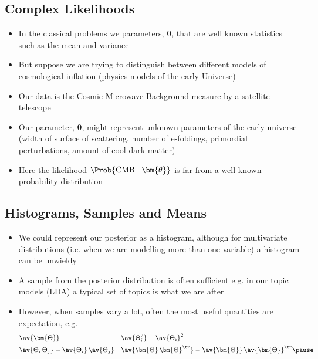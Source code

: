 \begin{slide}
\section[-2]{Complex Likelihoods}

\begin{PauseHighLight}\squeeze
  \begin{itemize}
  \item In the classical problems we  parameters,
    $\bm{\theta}$, that are well known statistics such as the mean and
    variance\pause
  \item But suppose we are trying to distinguish between different
    models of cosmological inflation (physics models of the early
    Universe)\pause
  \item Our data is the Cosmic Microwave Background measure by a
    satellite telescope\pause
  \item Our parameter, $\bm{\theta}$, might represent unknown
    parameters of the early universe (width of surface of scattering,
    number of e-foldings, primordial perturbations, amount of
    cool dark matter)\pause
  \item Here the likelihood $\Prob{\text{CMB} \mid \bm{\theta}}$ is
    far from a well known probability distribution\pause
  \end{itemize}
\end{PauseHighLight}


\end{slide}



\begin{slide}
\section{Histograms, Samples and Means}

\begin{PauseHighLight}
  \begin{itemize}
  \item We could represent our posterior as a histogram, although for
    multivariate distributions (i.e. when we are modelling more than one
    variable) a histogram can be unwieldy\pause
  \item A sample from the posterior distribution is often sufficient
    e.g. in our topic models (LDA) a typical set of topics is what we
    are after\pause
  \item However, when samples vary a lot, often the most useful quantities
    are expectation, e.g.
    \begin{align*}
      &\av{\bm{\Theta}} & &\av{\Theta_i^2}-\av{\Theta_i}^2 \\
      &\av{\Theta_i\,\Theta_j} - \av{\Theta_i}\,\av{\Theta_j}
      && \av{\bm{\Theta}\,\bm{\Theta}^\tr} -\av{\bm{\Theta}}\,\av{\bm{\Theta}}^\tr\pause
    \end{align*}
  \end{itemize}
\end{PauseHighLight}

\end{slide}



